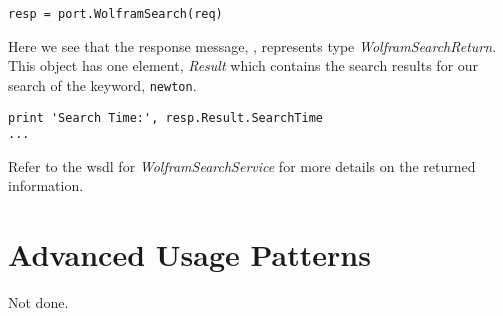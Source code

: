 \begin{verbatim}
resp = port.WolframSearch(req)
\end{verbatim}

Here we see that the response message, , represents type {\it WolframSearchReturn}.
This object has one element, {\it Result} which contains the search results for our
search of the keyword, {\tt newton}.

\begin{verbatim}
print 'Search Time:', resp.Result.SearchTime
...
\end{verbatim}

Refer to the wsdl for {\it WolframSearchService} for more details on the returned information.


\section{Advanced Usage Patterns}
Not done.



